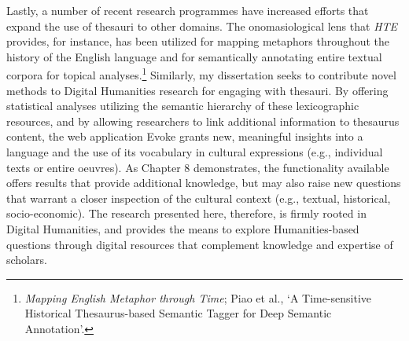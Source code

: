 Lastly, a number of recent research programmes have increased efforts that expand the use of thesauri to other domains. The onomasiological lens that \textit{HTE} provides, for instance, has been utilized for mapping metaphors throughout the history of the English language and for semantically annotating entire textual corpora for topical analyses.\footnote{\textit{Mapping English Metaphor through Time}; Piao et al., `A Time-sensitive Historical Thesaurus-based Semantic Tagger for Deep Semantic Annotation'.} Similarly, my dissertation seeks to contribute novel methods to Digital Humanities research for engaging with thesauri. By offering statistical analyses utilizing the semantic hierarchy of these lexicographic resources, and by allowing researchers to link additional information to thesaurus content, the web application Evoke grants new, meaningful insights into a language and the use of its vocabulary in cultural expressions (e.g., individual texts or entire oeuvres). As Chapter 8 demonstrates, the functionality available offers results that provide additional knowledge, but may also raise new questions that warrant a closer inspection of the cultural context (e.g., textual, historical, socio-economic). The research presented here, therefore, is firmly rooted in Digital Humanities, and provides the means to explore Humanities-based questions through digital resources that complement 
knowledge and expertise of scholars.


